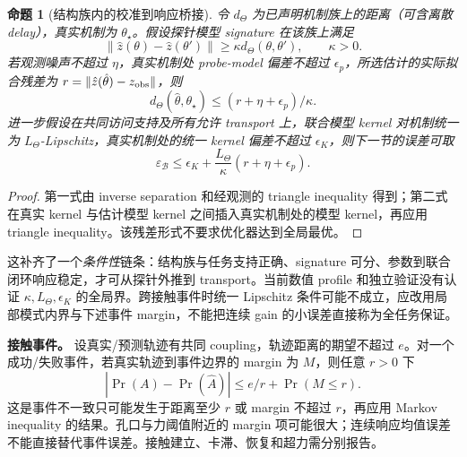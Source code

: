 \documentclass[11pt]{article}
\newtheorem{proposition}{命题}[section]
\begin{document}
\begin{proposition}[结构族内的校准到响应桥接]
令 $d_\Theta$ 为已声明机制族上的距离（可含离散 delay），真实机制为 $\theta_\star$。假设探针模型 signature 在该族上满足
\[
 \|\hat z(\theta)-\hat z(\theta')\|\ge\kappa d_\Theta(\theta,\theta'),\qquad \kappa>0.
\]
若观测噪声不超过 $\eta$，真实机制处 probe-model 偏差不超过 $\epsilon_p$，所选估计的实际拟合残差为 $r=\|\hat z(\hat\theta)-z_{\rm obs}\|$，则
\[
 d_\Theta(\hat\theta,\theta_\star)\le(r+\eta+\epsilon_p)/\kappa.
\]
进一步假设在共同访问支持及所有允许 transport 上，联合模型 kernel 对机制统一为 $L_\Theta$-Lipschitz，真实机制处的统一 kernel 偏差不超过 $\epsilon_K$，则下一节的误差可取
\[
 \varepsilon_{\mathcal B}\le\epsilon_K+\frac{L_\Theta}{\kappa}(r+\eta+\epsilon_p).
\]
\end{proposition}
\begin{proof}
第一式由 inverse separation 和经观测的 triangle inequality 得到；第二式在真实 kernel 与估计模型 kernel 之间插入真实机制处的模型 kernel，再应用 triangle inequality。该残差形式不要求优化器达到全局最优。
\end{proof}
这补齐了一个\emph{条件性}链条：结构族与任务支持正确、signature 可分、参数到联合闭环响应稳定，才可从探针外推到 transport。当前数值 profile 和独立验证没有认证 $\kappa,L_\Theta,\epsilon_K$ 的全局界。跨接触事件时统一 Lipschitz 条件可能不成立，应改用局部模式内界与下述事件 margin，不能把连续 gain 的小误差直接称为全任务保证。

\textbf{接触事件。} 设真实/预测轨迹有共同 coupling，轨迹距离的期望不超过 $e$。对一个成功/失败事件，若真实轨迹到事件边界的 margin 为 $M$，则任意 $r>0$ 下
\begin{equation}
 |\Pr(A)-\Pr(\hat A)|\le e/r+\Pr(M\le r).
\end{equation}
这是事件不一致只可能发生于距离至少 $r$ 或 margin 不超过 $r$，再应用 Markov inequality 的结果。孔口与力阈值附近的 margin 项可能很大；连续响应均值误差不能直接替代事件误差。接触建立、卡滞、恢复和超力需分别报告。
\end{document}
